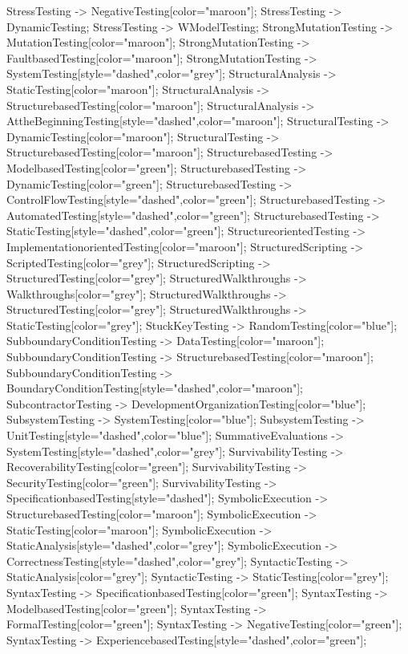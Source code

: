 \documentclass{article}
\begin{document}
{StressTesting -> NegativeTesting[color="maroon"];
StressTesting -> DynamicTesting;
StressTesting -> WModelTesting;
StrongMutationTesting -> MutationTesting[color="maroon"];
StrongMutationTesting -> FaultbasedTesting[color="maroon"];
StrongMutationTesting -> SystemTesting[style="dashed",color="grey"];
StructuralAnalysis -> StaticTesting[color="maroon"];
StructuralAnalysis -> StructurebasedTesting[color="maroon"];
StructuralAnalysis -> AttheBeginningTesting[style="dashed",color="maroon"];
StructuralTesting -> DynamicTesting[color="maroon"];
StructuralTesting -> StructurebasedTesting[color="maroon"];
StructurebasedTesting -> ModelbasedTesting[color="green"];
StructurebasedTesting -> DynamicTesting[color="green"];
StructurebasedTesting -> ControlFlowTesting[style="dashed",color="green"];
StructurebasedTesting -> AutomatedTesting[style="dashed",color="green"];
StructurebasedTesting -> StaticTesting[style="dashed",color="green"];
StructureorientedTesting -> ImplementationorientedTesting[color="maroon"];
StructuredScripting -> ScriptedTesting[color="grey"];
StructuredScripting -> StructuredTesting[color="grey"];
StructuredWalkthroughs -> Walkthroughs[color="grey"];
StructuredWalkthroughs -> StructuredTesting[color="grey"];
StructuredWalkthroughs -> StaticTesting[color="grey"];
StuckKeyTesting -> RandomTesting[color="blue"];
SubboundaryConditionTesting -> DataTesting[color="maroon"];
SubboundaryConditionTesting -> StructurebasedTesting[color="maroon"];
SubboundaryConditionTesting -> BoundaryConditionTesting[style="dashed",color="maroon"];
SubcontractorTesting -> DevelopmentOrganizationTesting[color="blue"];
SubsystemTesting -> SystemTesting[color="blue"];
SubsystemTesting -> UnitTesting[style="dashed",color="blue"];
SummativeEvaluations -> SystemTesting[style="dashed",color="grey"];
SurvivabilityTesting -> RecoverabilityTesting[color="green"];
SurvivabilityTesting -> SecurityTesting[color="green"];
SurvivabilityTesting -> SpecificationbasedTesting[style="dashed"];
SymbolicExecution -> StructurebasedTesting[color="maroon"];
SymbolicExecution -> StaticTesting[color="maroon"];
SymbolicExecution -> StaticAnalysis[style="dashed",color="grey"];
SymbolicExecution -> CorrectnessTesting[style="dashed",color="grey"];
SyntacticTesting -> StaticAnalysis[color="grey"];
SyntacticTesting -> StaticTesting[color="grey"];
SyntaxTesting -> SpecificationbasedTesting[color="green"];
SyntaxTesting -> ModelbasedTesting[color="green"];
SyntaxTesting -> FormalTesting[color="green"];
SyntaxTesting -> NegativeTesting[color="green"];
SyntaxTesting -> ExperiencebasedTesting[style="dashed",color="green"];
}
\end{document}

